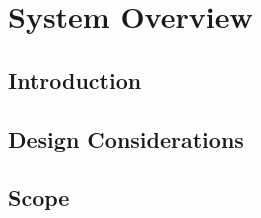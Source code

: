 \section{System Overview}
\label{sec:dp-tpcelec-overview}

\subsection{Introduction}
\label{ssec:dp-tpcelec-intro}

\subsection{Design Considerations}
\label{ssec:dp-tpcelec-requir}

\subsection{Scope}
\label{ssec:dp-tpcelec-scope}
